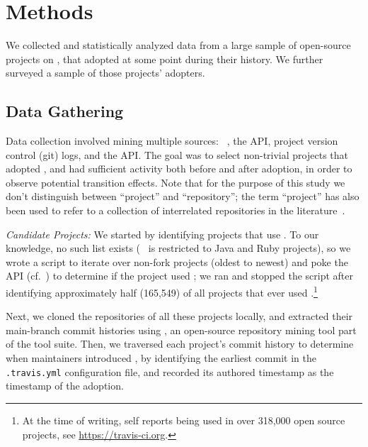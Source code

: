 
\section{Methods}
\label{sec:method}

We collected and statistically analyzed data from a large sample of open-source 
projects on \GH, that adopted \Tvis at some point during their history.
We further surveyed a sample of those projects' \Tvis adopters.

\subsection{Data Gathering}

Data collection involved mining multiple sources: \GHT~\cite{gousios2012ghtorrent}, 
the \GH API, project version control (git) logs, and the \Tvis API.
The goal was to select non-trivial projects that adopted \Tvis, and had sufficient
activity both before and after adoption, in order to observe potential transition effects.
Note that for the purpose of this study we don't distinguish between ``project'' 
and ``repository''; the term ``project'' has also been used to refer to a collection 
of interrelated repositories in the literature~\cite{vasilescu2016sky}.

\smallskip\noindent\emph{Candidate Projects:} 
We started by identifying \GH projects that use \Tvi.
To our knowledge, no such list exists 
(\TT~\cite{beller2017travistorrent} is restricted to Java and Ruby projects), so
we wrote a script to iterate over non-fork \GHT projects (oldest to newest)
and poke the \Tvis API (cf.\ \cite{era14}) to determine if the project used \Tvi;
we ran and stopped the script after identifying approximately half (165,549)
of all \GH projects that ever used \Tvis.\footnote{At the time of writing, \Tvi self 
reports being used in over 318,000 open source \GH projects, see 
\url{https://travis-ci.org}.} 

Next, we cloned the \GH repositories of all these projects locally, and extracted
their main-branch commit histories using \Perc, an open-source repository
mining tool part of the \GLab tool suite.%
Then, we traversed each project's commit history to determine when 
maintainers introduced \Tvis, by identifying the earliest commit in the 
\texttt{.travis.yml} configuration file, and recorded its authored timestamp as
the timestamp of the \Tvi adoption.

